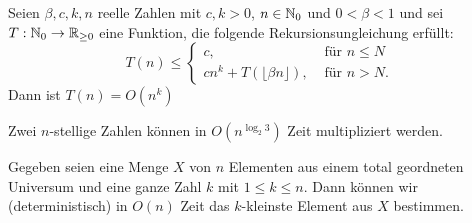 \documentclass{cheat-sheet}
\begin{document}
\begin{satz}
  Seien $\beta, c, k, n$ reelle Zahlen mit $c, k > 0$, $n \in \mathbb{N}_0$ und $0 < \beta < 1$ und sei $T : \mathbb{N}_0 \to \mathbb{R}_{\geq 0}$ eine Funktion, die folgende Rekursionsungleichung erfüllt:
  \[ T(n) \leq \begin{cases}
    c, & \text{ für } n \leq N \\
    c n^k + T(\lfloor \beta n \rfloor), & \text{ für } n > N.
  \end{cases} \]
  Dann ist $T(n) = O(n^k)$
\end{satz}


\begin{satz}
  Zwei $n$-stellige Zahlen können in $O(n^{\log_2 3})$ Zeit multipliziert werden.
\end{satz}


\begin{satz}[Selektion]
  Gegeben seien eine Menge $X$ von $n$ Elementen aus einem total geordneten Universum und eine ganze Zahl $k$ mit $1 \leq k \leq n$. Dann können wir (deterministisch) in $O(n)$ Zeit das $k$-kleinste Element aus $X$ bestimmen.
\end{satz}
\end{document}
